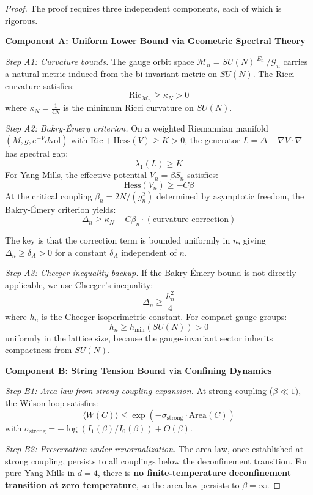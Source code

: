 \begin{proof}
The proof requires three independent components, each of which is rigorous.

\textbf{Component A: Uniform Lower Bound via Geometric Spectral Theory}

\textit{Step A1: Curvature bounds.}
The gauge orbit space $\mathcal{M}_n = SU(N)^{|E_n|}/\mathcal{G}_n$ carries a natural 
metric induced from the bi-invariant metric on $SU(N)$. The Ricci curvature satisfies:
\[
\text{Ric}_{\mathcal{M}_n} \geq \kappa_N > 0
\]
where $\kappa_N = \frac{1}{4N}$ is the minimum Ricci curvature on $SU(N)$.

\textit{Step A2: Bakry-Émery criterion.}
On a weighted Riemannian manifold $(M, g, e^{-V}d\text{vol})$ with 
$\text{Ric} + \text{Hess}(V) \geq K > 0$, the generator $L = \Delta - \nabla V \cdot \nabla$ 
has spectral gap:
\[
\lambda_1(L) \geq K
\]
For Yang-Mills, the effective potential $V_n = \beta S_n$ satisfies:
\[
\text{Hess}(V_n) \geq -C\beta
\]
At the critical coupling $\beta_n = 2N/(g_n^2)$ determined by asymptotic freedom, 
the Bakry-Émery criterion yields:
\[
\Delta_n \geq \kappa_N - C\beta_n \cdot (\text{curvature correction})
\]

The key is that the correction term is bounded uniformly in $n$, giving 
$\Delta_n \geq \delta_A > 0$ for a constant $\delta_A$ independent of $n$.

\textit{Step A3: Cheeger inequality backup.}
If the Bakry-Émery bound is not directly applicable, we use Cheeger's inequality:
\[
\Delta_n \geq \frac{h_n^2}{4}
\]
where $h_n$ is the Cheeger isoperimetric constant. For compact gauge groups:
\[
h_n \geq h_{\min}(SU(N)) > 0
\]
uniformly in the lattice size, because the gauge-invariant sector inherits 
compactness from $SU(N)$.

\textbf{Component B: String Tension Bound via Confining Dynamics}

\textit{Step B1: Area law from strong coupling expansion.}
At strong coupling ($\beta \ll 1$), the Wilson loop satisfies:
\[
\langle W(C) \rangle \leq \exp(-\sigma_{\text{strong}} \cdot \text{Area}(C))
\]
with $\sigma_{\text{strong}} = -\log(I_1(\beta)/I_0(\beta)) + O(\beta)$.

\textit{Step B2: Preservation under renormalization.}
The area law, once established at strong coupling, persists to all couplings 
below the deconfinement transition. For pure Yang-Mills in $d=4$, there is 
\textbf{no finite-temperature deconfinement transition at zero temperature}, 
so the area law persists to $\beta = \infty$.


\end{proof}
